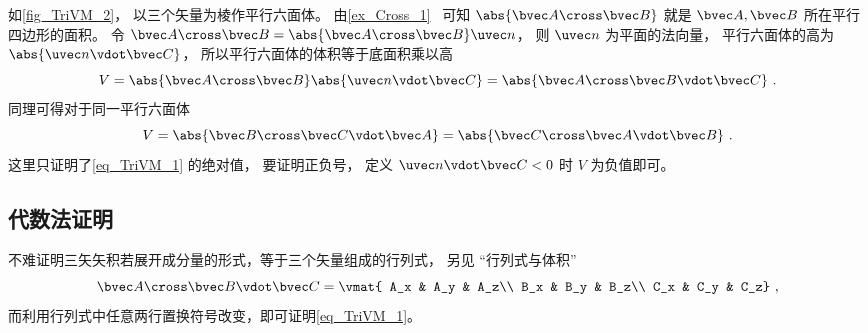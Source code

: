 如\autoref{fig_TriVM_2}， 以三个矢量为棱作平行六面体。 由\autoref{ex_Cross_1}~ 可知 $\abs{\bvec A \cross \bvec B}$ 就是 $\bvec A,\bvec B$ 所在平行四边形的面积。 令 $\bvec A \cross \bvec B = \abs{\bvec A \cross \bvec B} \uvec n$， 则 $\uvec n$ 为平面的法向量， 平行六面体的高为 $\abs{\uvec n \vdot \bvec C}$， 所以平行六面体的体积等于底面积乘以高
\begin{equation}
V = \abs{\bvec A \cross \bvec B} \abs{\uvec n \vdot \bvec C} = \abs{\bvec A \cross \bvec B \vdot \bvec C}~.
\end{equation}
同理可得对于同一平行六面体
\begin{equation}
V = \abs{\bvec B \cross \bvec C \vdot \bvec A} = \abs{\bvec C \cross \bvec A \vdot \bvec B} ~.
\end{equation}  
这里只证明了\autoref{eq_TriVM_1} 的绝对值， 要证明正负号， 定义 $\uvec n \vdot \bvec C < 0$ 时 $V$ 为负值即可。

\subsection{代数法证明}
不难证明三矢矢积若展开成分量的形式，等于三个矢量组成的行列式， 另见 “行列式与体积”
\begin{equation}
\bvec A \cross \bvec B \vdot \bvec C = \vmat{
A_x & A_y & A_z\\
B_x & B_y & B_z\\
C_x & C_y & C_z}~,
\end{equation}
而利用行列式中任意两行置换符号改变，即可证明\autoref{eq_TriVM_1}。

